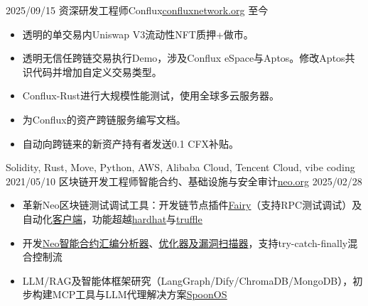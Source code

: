 %
%
%
\begin{experiences}
 \experience
    {2025/09/15}     {资深研发工程师}{Conflux}{\href{https://confluxnetwork.org}{\underline{confluxnetwork.org}}}
    {至今}    {
        \begin{itemize}
            \item 透明的单交易内Uniswap V3流动性NFT质押+做市。
            \item 透明无信任跨链交易执行Demo，涉及Conflux eSpace与Aptos。修改Aptos共识代码并增加自定义交易类型。
            \item Conflux-Rust进行大规模性能测试，使用全球多云服务器。
            \item 为Conflux的资产跨链服务编写文档。
            \item 自动向跨链来的新资产持有者发送0.1 CFX补贴。
        \end{itemize}
                    }
                    {Solidity, Rust, Move, Python, AWS, Alibaba Cloud, Tencent Cloud, vibe coding}
 \emptySeparator
 \experience
    {2021/05/10}     {区块链开发工程师}{智能合约、基础设施与安全审计}{\href{https://neo.org}{\underline{neo.org}}}
    {2025/02/28}    {
                      \begin{itemize}
                        \item 革新Neo区块链测试调试工具：开发链节点插件\href{https://github.com/Hecate2/neo-fairy-test/}{\underline{Fairy}}（支持RPC测试调试）及自动化\href{https://github.com/Hecate2/neo-fairy-client/}{\underline{客户端}}，功能超越\href{https://github.com/NomicFoundation/hardhat}{\underline{hardhat}}与\href{https://github.com/trufflesuite/truffle}{\underline{truffle}}
                        \item 开发\href{https://github.com/neo-project/neo-devpack-dotnet/tree/master/src/Neo.Compiler.CSharp/Optimizer}{\underline{Neo智能合约汇编分析器}}、\href{https://github.com/neo-project/neo-devpack-dotnet/tree/master/src/Neo.Compiler.CSharp/SecurityAnalyzer}{\underline{优化器及漏洞扫描器}}，支持try-catch-finally混合控制流
                        \item LLM/RAG及智能体框架研究（LangGraph/Dify/ChromaDB/MongoDB），初步构建MCP工具与LLM代理解决方案\href{https://github.com/xspoonai}{\underline{SpoonOS}}

\end{itemize}}
\end{experiences}
